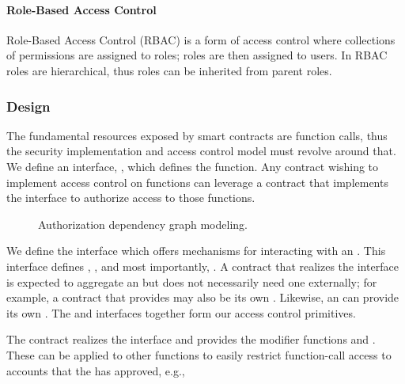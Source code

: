 
\paragraph{Role-Based Access Control}
Role-Based Access Control (RBAC) is a form of access control where collections
of permissions are assigned to roles; roles are then assigned to users. In RBAC
roles are hierarchical, thus roles can be inherited from parent roles.

\subsubsection{Design}
The fundamental resources exposed by smart contracts are function calls, thus
the security implementation and access control model must revolve around that.
We define an interface, , which defines the 
function. Any contract wishing to implement access control on functions can
leverage a contract that implements the  interface to authorize
access to those functions.

\begin{figure}[H]
  \centering
  \caption{Authorization dependency graph modeling.}\label{fig:authorization}
\end{figure}

We define the  interface which offers mechanisms for
interacting with an . This interface defines ,
, and most importantly, . A contract that
realizes the  interface is expected to aggregate an
 but does not necessarily need one externally; for example, a
contract that provides  may also be its own .
Likewise, an  can provide its own . The
 and  interfaces together form our access
control primitives.

The  contract realizes the  interface and provides
the modifier functions  and . These can be applied to
other functions to easily restrict function-call access to accounts that the
 has approved, e.g.,

